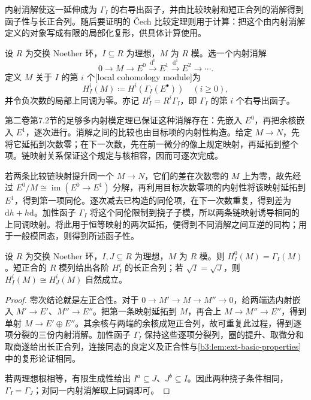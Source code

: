 \ProseParagraphBreak
内射消解使这一延伸成为 \(\Gamma_I\) 的右导出函子，并由比较映射和短正合列的消解得到函子性与长正合列。随后要证明的 Čech 比较定理则用于计算：把这个由内射消解定义的对象写成有限的局部化复形，供具体计算使用。

\begin{definition}\label{b3:def:local-cohomology}
	设 \(R\) 为交换 Noether 环，\(I\subseteq R\) 为理想，\(M\) 为 \(R\) 模。选一个内射消解
	\[
		0\longrightarrow M\longrightarrow E^0\xrightarrow{\mathrm{d}^0}E^1 \xrightarrow{\mathrm{d}^1}E^2\longrightarrow\cdots.
	\]
	定义 \(M\) 关于 \(I\) 的第 \(i\) 个[local cohomology module]为
	\[
		H_I^i(M)\coloneqq H^i(\Gamma_I(E^\bullet))\quad(i\ge0),
	\]
	并令负次数的局部上同调为零。亦记 \(H_I^i=R^i\Gamma_I\)，即 \(\Gamma_I\) 的第 \(i\) 个右导出函子。
\end{definition}

第二卷第7.2节的足够多内射模定理已保证这种消解存在：先嵌入 \(E^0\)，再把余核嵌入 \(E^1\)，逐次进行。消解之间的比较也由目标项的内射性构造。给定 \(M\to N\)，先将它延拓到次数零；在下一次数，先在前一微分的像上规定映射，再延拓到整个项。链映射关系保证这个规定与核相容，因而可逐次完成。

\ProseParagraphBreak
若两条比较链映射提升同一个 \(M\to N\)，它们的差在次数零的 \(M\) 上为零，故先经过 \(E^0/M\cong\operatorname{im}(E^0\to E^1)\) 分解，再利用目标次数零项的内射性将该映射延拓到 \(E^1\)，得到第一项同伦。逐次减去已构造的同伦项，在下一次数重复，得到差为 \(\mathrm{d}h+h\mathrm{d}\)。加性函子 \(\Gamma_I\) 将这个同伦限制到挠子子模，所以两条链映射诱导相同的上同调映射。将此用于恒等映射的两次延拓，便得到不同消解之间互逆的同构；用于一般模同态，则得到所述函子性。

\begin{proposition}\label{b3:prop:local-cohomology-basic}
	设 \(R\) 为交换 Noether 环，\(I,J\subseteq R\) 为理想，\(M\) 为 \(R\) 模。则 \(H_I^0(M)=\Gamma_I(M)\)。短正合的 \(R\) 模列给出各阶 \(H_I^i\) 的长正合列；若 \(\sqrt I=\sqrt J\)，则 \(H_I^i(M)\cong H_J^i(M)\) 自然成立。
\end{proposition}
\begin{proof}
	零次结论就是左正合性。对于 \(0\to M'\to M\to M''\to0\)，给两端选内射嵌入 \(M'\to E'\)、\(M''\to E''\)。把第一条映射延拓到 \(M\)，再合上 \(M\to M''\to E''\)，得到单射 \(M\to E'\oplus E''\)。其余核与两端的余核成短正合列，故可重复此过程，得到逐项分裂的三份内射消解。加性函子 \(\Gamma_I\) 保持这些逐项分裂列，圈的提升、取微分和取商遂给出长正合列，连接同态的良定义及正合性与\cref{b3:lem:ext-basic-properties}中的复形论证相同。

	若两理想根相等，有限生成性给出 \(I^a\subseteq J\)、\(J^b\subseteq I\)。因此两种挠子条件相同，\(\Gamma_I=\Gamma_J\)；对同一内射消解取上同调即可。
\end{proof}

